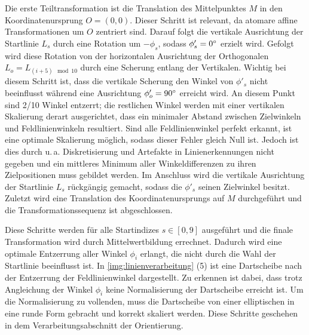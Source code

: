 Die erste Teiltransformation ist die Translation des Mittelpunktes $M$ in den Koordinatenursprung $O =(0, 0)$. Dieser Schritt ist relevant, da atomare affine Transformationen um $O$ zentriert sind. Darauf folgt die vertikale Ausrichtung der Startlinie $L_s$ durch eine Rotation um $-\phi_s$, sodass $\phi'_s = 0^{\circ}$ erzielt wird. Gefolgt wird diese Rotation von der horizontalen Ausrichtung der Orthogonalen $L_o = L_{(i+5) \mod 10}$ durch eine Scherung entlang der Vertikalen. Wichtig bei diesem Schritt ist, dass die vertikale Scherung den Winkel von $\phi'_s$ nicht beeinflusst während eine Ausrichtung $\phi'_o = 90^{\circ}$ erreicht wird. An diesem Punkt sind 2/10 Winkel entzerrt; die restlichen Winkel werden mit einer vertikalen Skalierung derart ausgerichtet, dass ein minimaler Abstand zwischen Zielwinkeln und Feldlinienwinkeln resultiert. Sind alle Feldlinienwinkel perfekt erkannt, ist eine optimale Skalierung möglich, sodass dieser Fehler gleich Null ist. Jedoch ist dies durch u.\,a. Diskretisierung und Artefakte in Linienerkennungen nicht gegeben und ein mittleres Minimum aller Winkeldifferenzen zu ihren Zielpositionen muss gebildet werden. Im Anschluss wird die vertikale Ausrichtung der Startlinie $L_s$ rückgängig gemacht, sodass die $\phi'_s$ seinen Zielwinkel besitzt. Zuletzt wird eine Translation des Koordinatenursprungs auf $M$ durchgeführt und die Transformationssequenz ist abgeschlossen.

Diese Schritte werden für alle Startindizes $s \in [0, 9]$ ausgeführt und die finale Transformation wird durch Mittelwertbildung errechnet. Dadurch wird eine optimale Entzerrung aller Winkel $\phi_i$ erlangt, die nicht durch die Wahl der Startlinie beeinflusst ist. In \autoref{img:linienverarbeitung} (5) ist eine Dartscheibe nach der Entzerrung der Feldlinienwinkel dargestellt. Zu erkennen ist dabei, dass trotz Angleichung der Winkel $\phi_i$ keine Normalisierung der Dartscheibe erreicht ist. Um die Normalisierung zu vollenden, muss die Dartscheibe von einer elliptischen in eine runde Form gebracht und korrekt skaliert werden. Diese Schritte geschehen in dem Verarbeitungsabschnitt der Orientierung.

